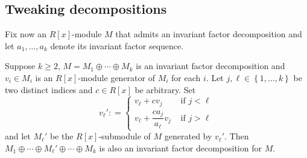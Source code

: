 \subsection{Tweaking  decompositions}   Fix now  an $R[x]$-module $ M$  that admits an invariant factor decomposition and let $ a_{1}, \ldots, a_{k} $ denote  its invariant factor sequence.    
\begin{lemma} \label{tweak}    Suppose $k \geq 2$, $ M =  M_{1} \oplus \cdots \oplus M_{k} $ is an invariant factor decomposition and $v_i \in M_i$ is an $R[x]$-module generator of $M_i$ for each $i$.   Let $ j , \ell  \in \left \{1, \ldots , k \right \} $ be two distinct  indices  and $ c \in R[x] $ be arbitrary.  Set $$   v_{\ell} '  :    =  \begin{cases} v_{\ell} + c v_{j} & \text{ if } j < \ell \\[0.5em]    
v_{\ell}  + \dfrac{ c  a_{j}}   {  a_{\ell}    }      v_{j}  & \text{ if } j > \ell 
\end{cases}  
$$  
and let $ M_{\ell} ' $ be the $R[x] $-submodule of  $ M $  generated by $ v_{\ell} ' $. Then $ M_{1} \oplus \cdots \oplus M_{\ell}' \oplus \cdots \oplus M_{k}  $ is also an  invariant factor decomposition for $ M $.    
\end{lemma}       


